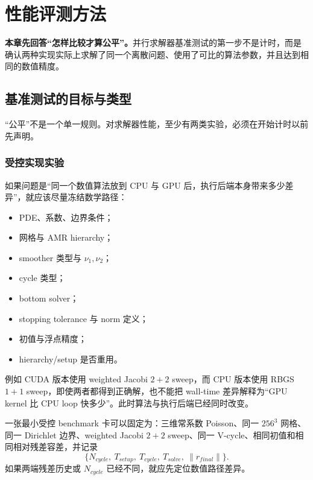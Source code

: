 \chapter{性能评测方法}
\label{ch:benchmarking}

\begin{keybox}
\textbf{本章先回答“怎样比较才算公平”。}并行求解器基准测试的第一步不是计时，而是确认两种实现实际上求解了同一个离散问题、使用了可比的算法参数，并且达到相同的数值精度。
\end{keybox}

\section{基准测试的目标与类型}

“公平”不是一个单一规则。对求解器性能，至少有两类实验，必须在开始计时以前先声明。

\subsection{受控实现实验}

如果问题是“同一个数值算法放到 CPU 与 GPU 后，执行后端本身带来多少差异”，就应该尽量冻结数学路径：
\begin{itemize}
\item PDE、系数、边界条件；
\item 网格与 AMR hierarchy；
\item smoother 类型与 $\nu_1,\nu_2$；
\item cycle 类型；
\item bottom solver；
\item stopping tolerance 与 norm 定义；
\item 初值与浮点精度；
\item hierarchy/setup 是否重用。
\end{itemize}

例如 CUDA 版本使用 weighted Jacobi $2+2$ sweep，而 CPU 版本使用 RBGS $1+1$ sweep，即使两者都得到正确解，也不能把 wall-time 差异解释为“GPU kernel 比 CPU loop 快多少”。此时算法与执行后端已经同时改变。

一张最小受控 benchmark 卡可以固定为：三维常系数 Poisson、同一 $256^3$ 网格、同一 Dirichlet 边界、weighted Jacobi $2+2$ sweep、同一 V-cycle、相同初值和相同相对残差容差，并记录
\begin{equation}
\{N_{cycle},\ T_{setup},\ T_{cycle},\ T_{solve},\ \|r_{final}\|\}.
\end{equation}
如果两端残差历史或 $N_{cycle}$ 已经不同，就应先定位数值路径差异。

